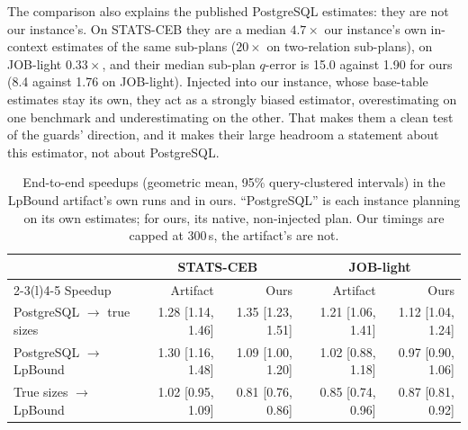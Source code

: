 \documentclass[sigconf, nonacm]{acmart}
\begin{document}
The comparison also explains the published PostgreSQL estimates: they are not
our instance's. On STATS-CEB they are a median $4.7\times$ our instance's own
in-context estimates of the same sub-plans ($20\times$ on two-relation
sub-plans), on JOB-light $0.33\times$, and their median sub-plan $q$-error is
15.0 against 1.90 for ours (8.4 against 1.76 on JOB-light). Injected into our instance,
whose base-table estimates stay its own, they act as a strongly biased
estimator, overestimating on one benchmark and underestimating on the other.
That makes them a clean test of the guards' direction, and it makes their
large headroom a statement about this estimator, not about PostgreSQL.

\begin{table}[t]
\centering
\caption{End-to-end speedups (geometric mean, 95\% query-clustered
intervals) in the LpBound artifact's own runs and in ours. ``PostgreSQL'' is
each instance planning on its own estimates; for ours, its native,
non-injected plan. Our timings are capped at 300\,s, the artifact's are not.}
\label{tab:replication}
\footnotesize
\setlength{\tabcolsep}{6pt}
\begin{tabular}{@{}lrrrr@{}}
\toprule
 & \multicolumn{2}{c}{STATS-CEB} & \multicolumn{2}{c}{JOB-light} \\
\cmidrule(lr){2-3}\cmidrule(l){4-5}
Speedup & Artifact & Ours & Artifact & Ours \\ \midrule
PostgreSQL $\to$ true sizes & 1.28 [1.14, 1.46] & 1.35 [1.23, 1.51] & 1.21 [1.06, 1.41] & 1.12 [1.04, 1.24] \\
PostgreSQL $\to$ LpBound & 1.30 [1.16, 1.48] & 1.09 [1.00, 1.20] & 1.02 [0.88, 1.18] & 0.97 [0.90, 1.06] \\
True sizes $\to$ LpBound & 1.02 [0.95, 1.09] & 0.81 [0.76, 0.86] & 0.85 [0.74, 0.96] & 0.87 [0.81, 0.92] \\
\bottomrule
\end{tabular}
\end{table}
\end{document}

